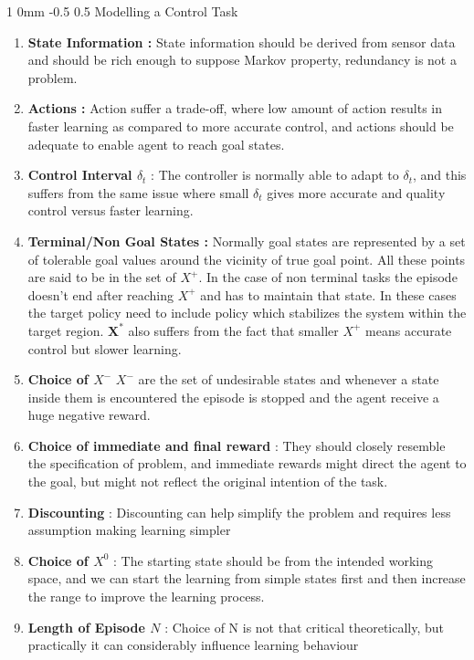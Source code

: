 \documentclass[twocolumn,11pt]{article}
\makeatletter
\renewcommand{\subsection}{\@startsection
{subsection}%
{1}%
{0mm}%
{-0.5\baselineskip}%
{0.5\baselineskip}%
{\bfseries\color{blue}}} %
\makeatother
\begin{document}
\subsection{Modelling a Control  Task}
\begin{enumerate}
\itemsep0em
\item \textbf{State  Information  : } State information should be derived from sensor data and should be rich enough to suppose Markov property, redundancy is not a problem.
\item  \textbf{Actions : } Action suffer a trade-off, where low amount of action results in faster learning as compared to more accurate control, and actions should be adequate  to enable agent to reach goal states.
\item \textbf{Control Interval $\delta_t$} : The  controller is normally able to adapt to $\delta_t$, and this suffers from the same issue where small $\delta_t$ gives more  accurate and quality control versus faster learning.
\item  \textbf{Terminal/Non Goal States :  } Normally goal states are represented by a set  of tolerable goal values around the vicinity of true goal point. All these  points are said to be in the  set of $X^+$. In the case of non terminal tasks the episode doesn't end after reaching $X^+$ and has to maintain that state. In these cases the target policy need to include policy which stabilizes  the system within the target region. $\textbf{X}^*$  also suffers from the fact that smaller $X^+$ means accurate  control but slower learning.

\item \textbf{Choice of $X^-$} $X^- $ are the set of undesirable states and whenever a state inside them is encountered the episode is stopped and the agent receive a huge negative reward.

\item \textbf{Choice of immediate and final reward} : They should closely resemble the specification of problem, and immediate rewards might direct the  agent to the goal, but might not reflect the original intention of the task.

\item \textbf{Discounting} : Discounting can help simplify the problem and requires less assumption making learning simpler 
\item \textbf{Choice of $X^0$} : The starting state should be from the intended working space, and we can start the learning from simple states first and then increase  the range to improve the learning process.
\item \textbf{Length of Episode $N$} : Choice of N is not that critical theoretically, but practically it can considerably influence learning behaviour 
\end{enumerate}
\end{document}
